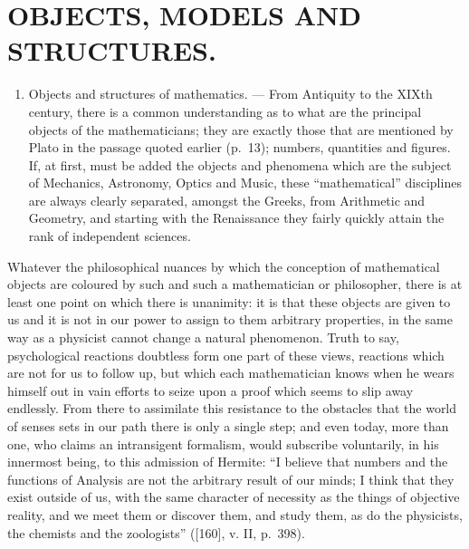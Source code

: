 \section*{OBJECTS, MODELS AND STRUCTURES.}
{}

\begin{enumerate}
\def\labelenumi{\Alph{enumi})}
\tightlist
\item
  Objects and structures of mathematics. --- From Antiquity to the XIXth century, there is a common understanding as to what are the principal objects of the mathematicians; they are exactly those that are mentioned by Plato in the passage quoted earlier (p.~13); numbers, quantities and figures. If, at first, must be added the objects and phenomena which are the subject of Mechanics, Astronomy, Optics and Music, these ``mathematical'' disciplines are always clearly separated, amongst the Greeks, from Arithmetic and Geometry, and starting with the Renaissance they fairly quickly attain the rank of independent sciences.
\end{enumerate}

Whatever the philosophical nuances by which the conception of mathematical objects are coloured by such and such a mathematician or philosopher, there is at least one point on which there is unanimity: it is that these objects are given to us and it is not in our power to assign to them arbitrary properties, in the same way as a physicist cannot change a natural phenomenon. Truth to say, psychological reactions doubtless form one part of these views, reactions which are not for us to follow up, but which each mathematician knows when he wears himself out in vain efforts to seize upon a proof which seems to slip away endlessly. From there to assimilate this resistance to the obstacles that the world of senses sets in our path there is only a single step; and even today, more than one, who claims an intransigent formalism, would subscribe voluntarily, in his innermost being, to this admission of Hermite: ``I believe that numbers and the functions of Analysis are not the arbitrary result of our minds; I think that they exist outside of us, with the same character of necessity as the things of objective reality, and we meet them or discover them, and study them, as do the physicists, the chemists and the zoologists'' ({[}160{]}, v. II, p.~398).

